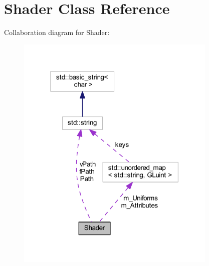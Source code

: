 \hypertarget{class_shader}{}\section{Shader Class Reference}
\label{class_shader}


Collaboration diagram for Shader\+:
\nopagebreak
\begin{figure}[H]
\begin{center}
\leavevmode
\includegraphics[width=271pt]{class_shader__coll__graph}
\end{center}
\end{figure}
